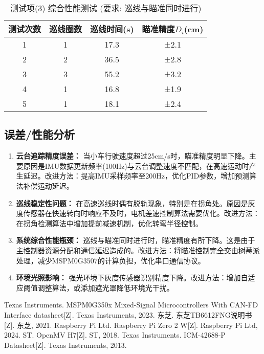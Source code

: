 \documentclass[UTF-8,zihao=-4]{ctexart}
\begin{document}
    \begin{table}[H]
        \centering
        \caption{测试项(3) 综合性能测试 (要求: 巡线与瞄准同时进行)}
        \label{tab:task3}
        \begin{tabular}{cccc}
            \toprule
            测试次数 & 巡线圈数 & 巡线时间(s) & 瞄准精度$D_i$(cm) \\
            \midrule
            1 & 1 & 17.3 & ±2.1 \\
            2 & 2 & 36.5 & ±2.8 \\
            3 & 3 & 55.2 & ±3.2 \\
            4 & 1 & 16.8 & ±1.9 \\
            5 & 1 & 18.1 & ±2.4 \\
            \bottomrule
        \end{tabular}
    \end{table}

\subsection{误差/性能分析}
    \begin{enumerate}
        \item \textbf{云台追踪精度误差：} 当小车行驶速度超过25cm/s时，瞄准精度明显下降。主要原因是IMU数据更新频率(100Hz)与云台调整速度不匹配，在高速运动时产生延迟。改进方法：提高IMU采样频率至200Hz，优化PID参数，增加预测算法补偿运动延迟。
        
        \item \textbf{巡线稳定性问题：} 在高速巡线时偶有脱轨现象，特别是在拐角处。原因是灰度传感器在快速转向时响应不及时，电机差速控制算法需要优化。改进方法：在拐角检测算法中增加提前减速机制，优化转弯半径控制。
        
        \item \textbf{系统综合性能瓶颈：} 巡线与瞄准同时进行时，瞄准精度有所下降。这是由于主控制器资源分配和通信延迟造成的。改进方法：将瞄准控制完全交由树莓派处理，减少MSPM0G3507的计算负担，优化串口通信协议。
        
        \item \textbf{环境光照影响：} 强光环境下灰度传感器识别精度下降。改进方法：增加自适应阈值调整算法，或添加遮光罩降低环境光干扰。
    \end{enumerate}
\begin{thebibliography}{99}
     Texas Instruments. MSPM0G350x Mixed-Signal Microcontrollers With CAN-FD Interface datasheet[Z]. Texas Instruments, 2023.
     东芝. 东芝TB6612FNG说明书[Z]. 东芝, 2021.
     Raspberry Pi Ltd. Raspberry Pi Zero 2 W[Z]. Raspberry Pi Ltd, 2024.
     ST. OpenMV H7[Z]. ST, 2018.
     Texas Instruments. ICM-42688-P Datasheet[Z]. Texas Instruments, 2013.
\end{thebibliography}
\end{document}

